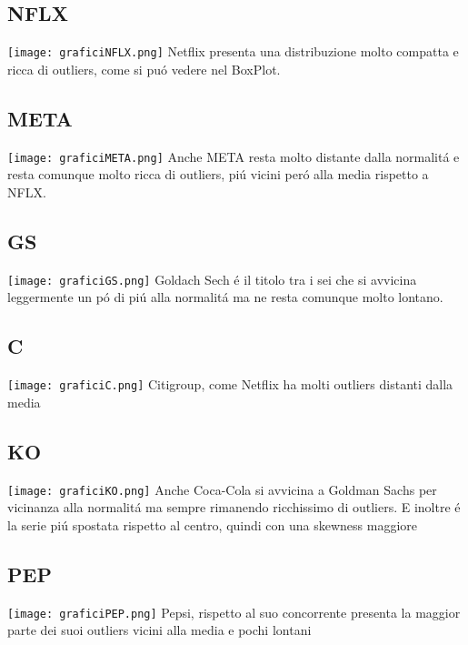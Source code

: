 \documentclass{report}
\begin{document}
\subsection{NFLX}
\texttt{[image: graficiNFLX.png]}
Netflix presenta una distribuzione molto compatta e ricca di outliers, come si puó vedere nel BoxPlot.
\subsection{META}
\texttt{[image: graficiMETA.png]}
Anche META resta molto distante dalla normalitá e resta comunque molto ricca di outliers, piú vicini peró alla media rispetto a NFLX.
\subsection{GS}
\texttt{[image: graficiGS.png]}
Goldach Sech é il titolo tra i sei che si avvicina leggermente un pó di piú alla normalitá ma ne resta comunque molto lontano.
\subsection{C}
\texttt{[image: graficiC.png]}
Citigroup, come Netflix ha molti outliers distanti dalla media
\subsection{KO}
\texttt{[image: graficiKO.png]}
Anche Coca-Cola si avvicina a Goldman Sachs per vicinanza alla normalitá ma sempre rimanendo ricchissimo di outliers. E inoltre é la serie piú spostata rispetto al centro, quindi con una skewness maggiore
\subsection{PEP}
\texttt{[image: graficiPEP.png]}
Pepsi, rispetto al suo concorrente presenta la maggior parte dei suoi outliers vicini alla media e pochi lontani
\end{document}
